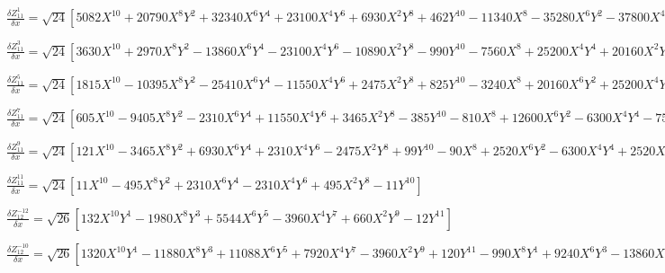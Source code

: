 \documentclass[10pt,landscape]{article}
\begin{document}
\vspace{1.2 mm}
\noindent $ \frac{\delta Z^{1}_{11}}{\delta x} = \sqrt{24} [5082X^{10} +20790X^{8}Y^{2} +32340X^{6}Y^{4} +23100X^{4}Y^{6} +6930X^{2}Y^{8} +462Y^{10} -11340X^{8} -35280X^{6}Y^{2} -37800X^{4}Y^{4} -15120X^{2}Y^{6} -1260Y^{8} +8820X^{6} +18900X^{4}Y^{2} +11340X^{2}Y^{4} +1260Y^{6} -2800X^{4} -3360X^{2}Y^{2} -560Y^{4} +315X^{2} +105Y^{2} -6] $

\vspace{1.2 mm}
\noindent $ \frac{\delta Z^{3}_{11}}{\delta x} = \sqrt{24} [3630X^{10} +2970X^{8}Y^{2} -13860X^{6}Y^{4} -23100X^{4}Y^{6} -10890X^{2}Y^{8} -990Y^{10} -7560X^{8} +25200X^{4}Y^{4} +20160X^{2}Y^{6} +2520Y^{8} +5292X^{6} -3780X^{4}Y^{2} -11340X^{2}Y^{4} -2268Y^{6} -1400X^{4} +1680X^{2}Y^{2} +840Y^{4} +105X^{2} -105Y^{2}] $

\vspace{1.2 mm}
\noindent $ \frac{\delta Z^{5}_{11}}{\delta x} = \sqrt{24} [1815X^{10} -10395X^{8}Y^{2} -25410X^{6}Y^{4} -11550X^{4}Y^{6} +2475X^{2}Y^{8} +825Y^{10} -3240X^{8} +20160X^{6}Y^{2} +25200X^{4}Y^{4} -1800Y^{8} +1764X^{6} -11340X^{4}Y^{2} -3780X^{2}Y^{4} +1260Y^{6} -280X^{4} +1680X^{2}Y^{2} -280Y^{4}] $

\vspace{1.2 mm}
\noindent $ \frac{\delta Z^{7}_{11}}{\delta x} = \sqrt{24} [605X^{10} -9405X^{8}Y^{2} -2310X^{6}Y^{4} +11550X^{4}Y^{6} +3465X^{2}Y^{8} -385Y^{10} -810X^{8} +12600X^{6}Y^{2} -6300X^{4}Y^{4} -7560X^{2}Y^{6} +630Y^{8} +252X^{6} -3780X^{4}Y^{2} +3780X^{2}Y^{4} -252Y^{6}] $

\vspace{1.2 mm}
\noindent $ \frac{\delta Z^{9}_{11}}{\delta x} = \sqrt{24} [121X^{10} -3465X^{8}Y^{2} +6930X^{6}Y^{4} +2310X^{4}Y^{6} -2475X^{2}Y^{8} +99Y^{10} -90X^{8} +2520X^{6}Y^{2} -6300X^{4}Y^{4} +2520X^{2}Y^{6} -90Y^{8}] $

\vspace{1.2 mm}
\noindent $ \frac{\delta Z^{11}_{11}}{\delta x} = \sqrt{24} [11X^{10} -495X^{8}Y^{2} +2310X^{6}Y^{4} -2310X^{4}Y^{6} +495X^{2}Y^{8} -11Y^{10}] $

\vspace{1.2 mm}
\noindent $ \frac{\delta Z^{-12}_{12}}{\delta x} = \sqrt{26} [132X^{10}Y^{1} -1980X^{8}Y^{3} +5544X^{6}Y^{5} -3960X^{4}Y^{7} +660X^{2}Y^{9} -12Y^{11}] $

\vspace{1.2 mm}
\noindent $ \frac{\delta Z^{-10}_{12}}{\delta x} = \sqrt{26} [1320X^{10}Y^{1} -11880X^{8}Y^{3} +11088X^{6}Y^{5} +7920X^{4}Y^{7} -3960X^{2}Y^{9} +120Y^{11} -990X^{8}Y^{1} +9240X^{6}Y^{3} -13860X^{4}Y^{5} +3960X^{2}Y^{7} -110Y^{9}] $
\end{document}
